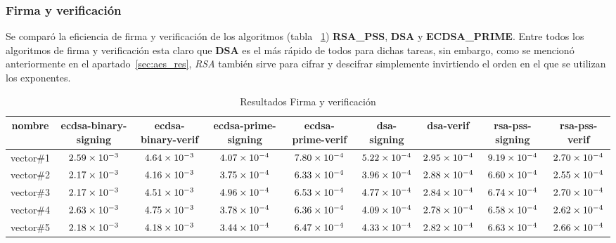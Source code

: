 \documentclass[../main.tex]{subfiles}
\begin{document}
\newpage{}

\subsubsection{Firma y verificación}\label{sec:firma-y-verificacion}

Se comparó la eficiencia de firma y verificación de los algoritmos (tabla
~\ref{tab:hash-res}) \textbf{RSA\_PSS}, \textbf{DSA} y \textbf{ECDSA\_PRIME}. Entre todos
los algoritmos de firma y verificación esta claro que \textbf{DSA} es el más rápido de
todos para dichas tareas, sin embargo, como se mencionó anteriormente en el
apartado~\ref{sec:aes_res}, \textit{RSA} también sirve para cifrar y descifrar
simplemente invirtiendo el orden en el que se utilizan los exponentes.
\begin{table}[ht]
  \scriptsize
  \centering
  \caption{Resultados Firma y verificación}\label{tab:hash-res}
  \begin{tabular}{|c|c|c|c|c|c|c|c|c|}
    \hline
    \rowcolor[HTML]{000000}
    {\color[HTML]{FFFFFF} nombre} &
  {\color[HTML]{FFFFFF} ecdsa-binary-signing} &
  {\color[HTML]{FFFFFF} ecdsa-binary-verif} &
  {\color[HTML]{FFFFFF} ecdsa-prime-signing} &
  {\color[HTML]{FFFFFF} ecdsa-prime-verif} &
  {\color[HTML]{FFFFFF} dsa-signing} &
  {\color[HTML]{FFFFFF} dsa-verif} &
  {\color[HTML]{FFFFFF} rsa-pss-signing} &
  {\color[HTML]{FFFFFF} rsa-pss-verif} \\ \hline
    vector\#1  & $\num{2.59E-03}$ & $\num{4.64E-03}$ & $\num{4.07E-04}$ & $\num{7.80E-04}$ & $\num{5.22E-04}$ & $\num{2.95E-04}$ & $\num{9.19E-04}$ & $\num{2.70E-04}$ \\ \hline
    \rowcolor[HTML]{C0C0C0}
    vector\#2 & $\num{2.17E-03}$ & $\num{4.16E-03}$ & $\num{3.75E-04}$ & $\num{6.33E-04}$ & $\num{3.96E-04}$ & $\num{2.88E-04}$ & $\num{6.60E-04}$ & $\num{2.55E-04}$ \\ \hline
    vector\#3 & $\num{2.17E-03}$ & $\num{4.51E-03}$ & $\num{4.96E-04}$ & $\num{6.53E-04}$ & $\num{4.77E-04}$ & $\num{2.84E-04}$ & $\num{6.74E-04}$ & $\num{2.70 E-04}$ \\ \hline
    \rowcolor[HTML]{C0C0C0}
    vector\#4 & $\num{2.63E-03}$ & $\num{4.75E-03}$ & $\num{3.78E-04}$ & $\num{6.36E-04}$ & $\num{4.09E-04}$ & $\num{2.78E-04}$ & $\num{6.58E-04}$ & $\num{2.62E-04}$ \\ \hline
    vector\#5  & $\num{2.18E-03}$ & $\num{4.18E-03}$ & $\num{3.44E-04}$ & $\num{6.47E-04}$ & $\num{4.33E-04}$ & $\num{2.82E-04}$ & $\num{6.63E-04}$ & $\num{2.66E-04}$ \\ \hline

\end{tabular}
\end{table}
\end{document}
